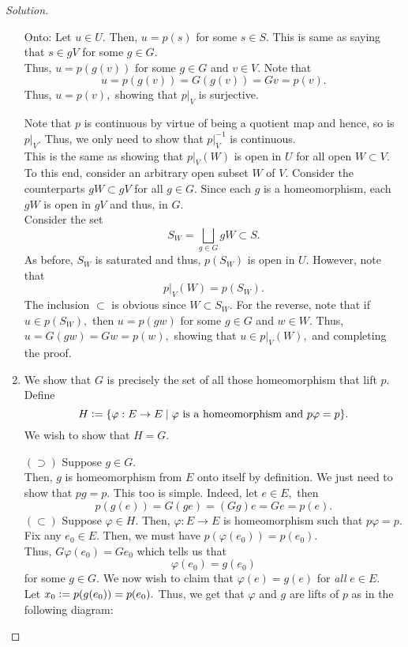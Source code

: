 \documentclass[12pt]{article}
\theoremstyle{definition}
\numberwithin{thm}{section}
\newenvironment{soln}{\begin{proof}[Solution]}{\end{proof}}
\begin{document}
\begin{soln}
\begin{enumerate}
		Onto: Let $u \in U.$ Then, $u = p(s)$ for some $s \in S.$ This is same as saying that $s \in gV$ for some $g \in G.$\\
		Thus, $u = p(g(v))$ for some $g \in G$ and $v \in V.$ Note that
		\begin{equation*} 
			u = p(g(v)) = G(g(v)) = Gv = p(v).
		\end{equation*}
		Thus, $u = p(v),$ showing that $p|_V$ is surjective.

		Note that $p$ is continuous by virtue of being a quotient map and hence, so is $p|_V.$ Thus, we only need to show that $p|_V^{-1}$ is continuous.\\
		This is the same as showing that $p|_V(W)$ is open in $U$ for all open $W \subset V.$\\
		To this end, consider an arbitrary open subset $W$ of $V.$ Consider the counterparts $gW \subset gV$ for all $g \in G.$ Since each $g$ is a homeomorphism, each $gW$ is open in $gV$ and thus, in $G.$\\
		Consider the set
		\begin{equation*} 
			S_W = \bigsqcup_{g \in G} gW \subset S.
		\end{equation*}
		As before, $S_W$ is saturated and thus, $p(S_W)$ is open in $U.$ However, note that
		\begin{equation*} 
			p|_V(W) = p(S_W).
		\end{equation*}
		The inclusion $\subset$ is obvious since $W \subset S_W.$ For the reverse, note that if $u \in p(S_W),$ then $u = p(gw)$ for some $g \in G$ and $w \in W.$ Thus, $u = G(gw) = Gw = p(w),$ showing that $u \in p|_V(W),$ and completing the proof.
		\item We show that $G$ is precisely the set of all those homeomorphism that lift $p.$ Define
		\begin{equation*} 
			H \vcentcolon= \{\varphi : E \to E \mid \varphi \text{ is a homeomorphism and } p\varphi = p\}.
		\end{equation*}
		We wish to show that $H = G.$

		$(\supset)$ Suppose $g \in G.$\\
		Then, $g$ is homeomorphism from $E$ onto itself by definition. We just need to show that $pg = p.$ This too is simple. Indeed, let $e \in E,$ then
		\begin{equation*} 
			p(g(e)) = G(ge) = (Gg)e = Ge = p(e).
		\end{equation*}
		$(\subset)$ Suppose $\varphi \in H.$ Then, $\varphi:E \to E$ is homeomorphism such that $p\varphi = p.$\\
		Fix any $e_0 \in E.$ Then, we must have $p(\varphi(e_0)) = p(e_0).$\\
		Thus, $G\varphi(e_0) = Ge_0$ which tells us that
		\begin{equation*} 
			\varphi(e_0) = g(e_0)
		\end{equation*}
		for some $g \in G.$ We now wish to claim that $\varphi(e) = g(e)$ for \emph{all} $e \in E.$\\
		Let $x_0 \vcentcolon= p(g(e_0)) = p(e_0).$ Thus, we get that $\varphi$ and $g$ are lifts of $p$ as in the following diagram:
		

\end{enumerate}
\end{soln}
\end{document}

